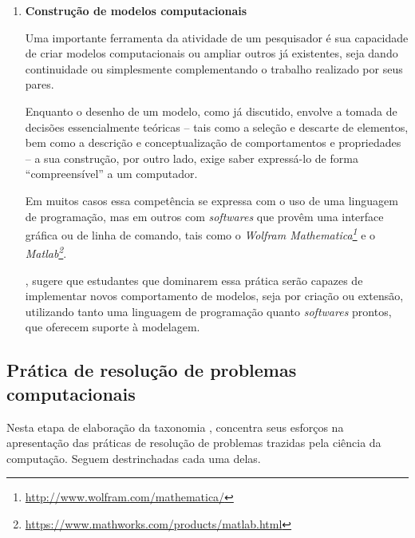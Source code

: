 \begin{enumerate}
  \item \textbf{Construção de modelos computacionais}

  Uma importante ferramenta da atividade de um pesquisador é sua capacidade de criar modelos computacionais ou ampliar outros já existentes, seja dando continuidade ou simplesmente complementando o trabalho realizado por seus pares. 

  Enquanto o desenho de um modelo, como já discutido, envolve a tomada de decisões essencialmente teóricas -- tais como a seleção e descarte de elementos, bem como a descrição e conceptualização de comportamentos e propriedades -- a sua construção, por outro lado, exige saber expressá-lo de forma ``compreensível'' a um computador. 
  
  Em muitos casos essa competência se expressa com o uso de uma linguagem de programação, mas em outros com \textit{softwares} que provêm uma interface gráfica ou de linha de comando, tais como o \textit{Wolfram Mathematica\footnote{\href{http://www.wolfram.com/mathematica/}{http://www.wolfram.com/mathematica/} }} e o \textit{Matlab\footnote{\href{https://www.mathworks.com/products/matlab.html}{https://www.mathworks.com/products/matlab.html}}}.

  , sugere que estudantes que dominarem essa prática serão capazes de implementar novos comportamento de modelos, seja por criação ou extensão, utilizando tanto uma linguagem de programação quanto \textit{softwares} prontos, que oferecem suporte à modelagem.
\end{enumerate}

\subsection{Prática de resolução de problemas computacionais}\label{sub-sec:pratica-de-resolucao-de-problemas-computacionais} 

Nesta etapa de elaboração da taxonomia , concentra seus esforços na apresentação das práticas de resolução de problemas trazidas pela ciência da computação. Seguem destrinchadas cada uma delas. 

